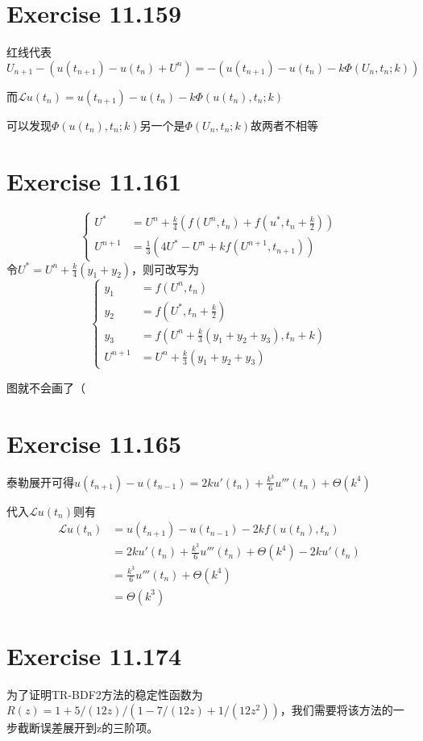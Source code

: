 \documentclass[twoside,a4paper]{article}
\begin{document}
\pagestyle{fancy}
\fancyhead{}

\section{Exercise 11.159}
红线代表$U_{n+1}-(u(t_{n+1})-u(t_{n})+U^n)=-(u(t_{n+1})-u(t_{n})-k\Phi(U_n,t_n;k))$

而$\mathcal{L}u(t_n)=u(t_{n+1})-u(t_{n})-k\Phi(u(t_n),t_n;k)$

可以发现$\Phi(u(t_n),t_n;k)$另一个是$\Phi(U_n,t_n;k)$故两者不相等
\section{Exercise 11.161}
$$\left\{\begin{aligned}
    U^* & = U^n+\frac{k}{4}(f(U^n, t_n)+f(u^*,t_n+\frac{k}{2})) \\
    U^{n+1} & = \frac{1}{3}(4U^*-U^n+kf(U^{n+1} ,t_{n+1}))
  \end{aligned}\right.$$
令$U^* = U^n+\frac{k}{4}(y_1+y_2)$，则可改写为
$$\left\{
 \begin{aligned}
 y_1&=f(U^n, t_n)\\
 y_2 &= f(U^*, t_n + \frac{k}{2})\\
 y_3 &= f(U^n + \frac{k}{3}(y_1 + y_2+ y_3), t_n+k)\\
 U^{n+1} &= U^n + \frac{k}{3}(y_1+y_2 +y_3)
 \end{aligned}\right.$$

 图就不会画了（
 
\section{Exercise 11.165}
泰勒展开可得$u(t_{n+1}) - u(t_{n-1})=2ku'(t_n) + \frac{k^3}{6}u'''(t_n) +\Theta(k^4)$

代入$\mathcal{L}u(t_n)$则有
$$\begin{aligned}
    \mathcal{L}u(t_n) &= u(t_{n+1}) - u(t_{n-1}) - 2kf(u(t_n), t_n)\\
    &= 2ku'(t_n) + \frac{k^3}{6}u'''(t_n) +\Theta(k^4)- 2ku'(t_n)\\
    &= \frac{k^3}{6}u'''(t_n)+\Theta(k^4) \\
    &= \Theta(k^3)
\end{aligned}$$

\section{Exercise 11.174}
为了证明TR-BDF2方法的稳定性函数为$R(z)=1+5/(12z)/(1-7/(12z)+1/(12z^2))$，我们需要将该方法的一步截断误差展开到z的三阶项。
\end{document}
